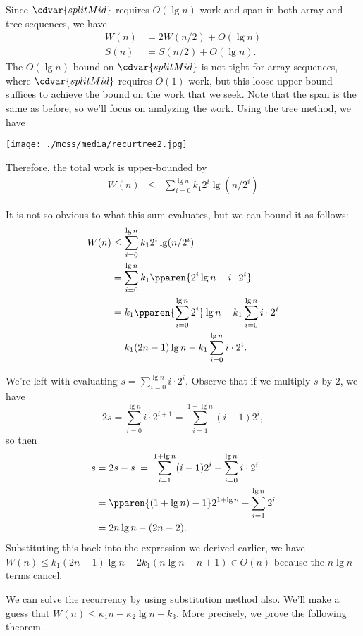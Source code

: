 \begin{gram}
Since $\cdvar{splitMid}$ requires $O(\lg n)$ work and
span in both array and tree sequences, we have
\begin{align*}
  W(n) &= 2 W(n/2) + O(\lg n)\\
  S(n) &= S(n/2) + O(\lg n).
\end{align*}
%
The $O(\lg{n})$ bound on $\cdvar{splitMid}$ is not tight for array sequences, where $\cdvar{splitMid}$ requires $O(1)$ work, but this loose upper bound suffices to achieve the bound on the work that we seek.
%
Note that the
span is the same as before, so we'll focus on analyzing the work.  Using the
tree method, we have
\begin{center}
  \texttt{[image: ./mcss/media/recurtree2.jpg]}
\end{center}

Therefore, the total work is upper-bounded by
\begin{eqnarray*}
  W(n) &\leq& \sum_{i=0}^{\lg n} k_1 2^i \lg (n/2^i)
\end{eqnarray*}

It is not so obvious to what this sum evaluates, but we can bound it
as follows:
\begin{align*}
  W(n) &\leq \sum_{i=0}^{\lg n} k_1 2^i \lg (n/2^i) \\
  &= \sum_{i=0}^{\lg n} k_1 \pparen{2^i\lg n - i\cdot 2^i} \\
  &= k_1\pparen{\sum_{i=0}^{\lg n} 2^i}\lg n - k_1\sum_{i=0}^{\lg n} i\cdot 2^i\\
  &= k_1(2n - 1)\lg n - k_1\sum_{i=0}^{\lg n} i\cdot 2^i.
\end{align*}

We're left with evaluating $s = \sum_{i=0}^{\lg n} i\cdot 2^i$.  Observe that
if we multiply $s$ by $2$, we have
\[
2s = \sum_{i=0}^{\lg n} i\cdot 2^{i+1} = \sum_{i=1}^{1 + \lg n} (i-1)2^i,
\]
so then
\begin{align*}
s &= 2s - s \;=\; \sum_{i=1}^{1 + \lg n} (i-1)2^i - \sum_{i=0}^{\lg n} i\cdot 2^i\\
&= \pparen{(1 + \lg n)  - 1}2^{1 + \lg n} - \sum_{i=1}^{\lg n} 2^i \\
&= 2n\lg n - (2n -2).
\end{align*}
Substituting this back into the expression we derived earlier, we have $W(n)
\leq k_1(2n - 1)\lg n - 2k_1(n \lg n - n + 1) \in O(n)$ because the $n\lg n$
terms cancel.
\end{gram}

\begin{gram}
We can solve the recurrency by using substitution method also.  We'll
make a guess that $W(n) \leq \kappa_1 n - \kappa_2 \lg n - k_3$.
More precisely, we prove the following theorem.
\end{gram}

